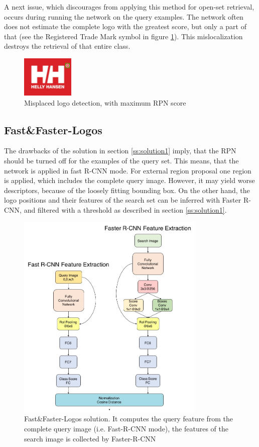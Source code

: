 A next issue, which discourages from applying this method for open-set retrieval, occurs during running the network on the query examples. The network often does not estimate the complete logo with the greatest score, but only a part of that (see the Registered Trade Mark symbol in figure \ref{f:missdet}). This mislocalization destroys the retrieval of that entire class.
\begin{figure}
  \centering
  \includegraphics[width=25mm]{images/mt/missdet.jpg}
  \caption{Misplaced logo detection, with maximum RPN score}
  \label{f:missdet}
\end{figure}
\subsection{Fast\&Faster-Logos}\label{ss:solution2}
The drawbacks of the solution in section \ref{ss:solution1} imply, that the RPN should be turned off for the examples of the query set. This means, that the network is applied in fast R-CNN mode. For external region proposal one region is applied, which includes the complete query image. However, it may yield worse descriptors, because of the loosely fitting bounding box. On the other hand, the logo positions and their features of the search set can be inferred with Faster R-CNN, and filtered with a threshold as described in section \ref{ss:solution1}.
\begin{figure}
  \centering
  \includegraphics[width=90mm]{images/mt/sol2_arch.jpg}
  \caption{Fast\&Faster-Logos solution. It computes the query feature from the complete query image (i.e. Fast-R-CNN mode), the features of the search image is collected by Faster-R-CNN}
  \label{f:sol2arch}
\end{figure}
